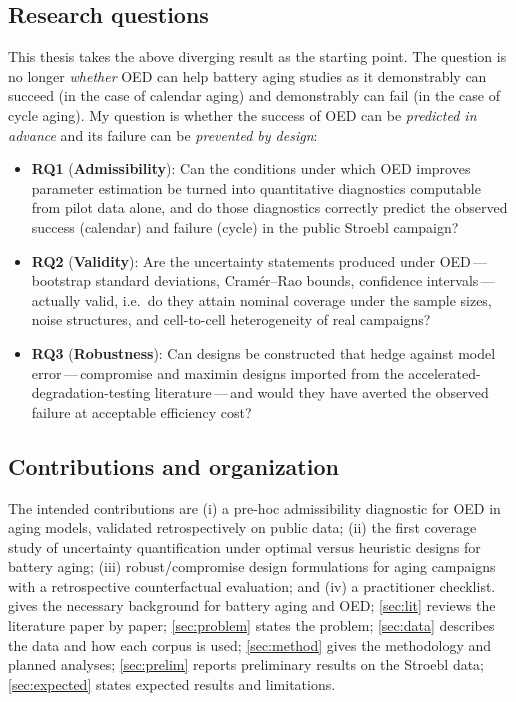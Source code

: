 \documentclass[11pt,letterpaper]{article}
\newcommand{\dash}{\,---\,}
\newcommand{\RQ}[1]{\textbf{RQ#1}}
\begin{document}
\subsection{Research questions}
This thesis takes the above diverging result as the starting point. The question is no longer \emph{whether} OED can help battery aging studies as it demonstrably can succeed (in the case of calendar aging) and demonstrably can fail (in the case of cycle aging). My question is whether the success of OED can be \emph{predicted in advance} and its failure can be \emph{prevented by design}:
\begin{itemize}
  \item \RQ{1} (\textbf{Admissibility}): Can the conditions under which OED improves parameter estimation be turned into quantitative diagnostics computable from pilot data alone, and do those diagnostics correctly predict the observed success (calendar) and failure (cycle) in the public Stroebl campaign?
  \item \RQ{2} (\textbf{Validity}): Are the uncertainty statements produced under OED\dash bootstrap standard deviations, Cram\'er--Rao bounds, confidence intervals\dash actually valid, i.e.\ do they attain nominal coverage under the sample sizes, noise structures, and cell-to-cell heterogeneity of real campaigns?
  \item \RQ{3} (\textbf{Robustness}): Can designs be constructed that hedge against model error\dash compromise and maximin designs imported from the accelerated-degradation-testing literature\dash and would they have averted the observed failure at acceptable efficiency cost?
\end{itemize}

\subsection{Contributions and organization}
The intended contributions are (i) a pre-hoc admissibility diagnostic for OED in aging models, validated retrospectively on public data; (ii) the first coverage study of uncertainty quantification under optimal versus heuristic designs for battery aging; (iii) robust/compromise design formulations for aging campaigns with a retrospective counterfactual evaluation; and (iv) a practitioner checklist.  gives the necessary background for battery aging and OED; \cref{sec:lit} reviews the literature paper by paper; \cref{sec:problem} states the problem; \cref{sec:data} describes the data and how each corpus is used; \cref{sec:method} gives the methodology and planned analyses; \cref{sec:prelim} reports preliminary results on the Stroebl data; \cref{sec:expected} states expected results and limitations.
\end{document}
